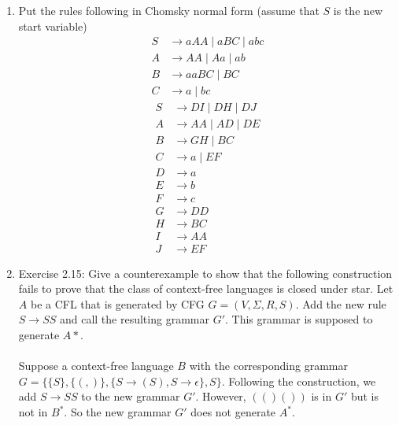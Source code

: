 \documentclass{article}
\begin{document}
\begin{enumerate}
        \item Put the rules following in Chomsky normal form (assume that $S$ is the new start variable)
            \begin{align*}
                S&\rightarrow aAA \mid aBC \mid abc\\
                A&\rightarrow AA \mid Aa \mid ab\\
                B&\rightarrow aaBC \mid BC\\
                C&\rightarrow a\mid bc
            \end{align*}
            \begin{align*}
                S&\rightarrow DI \mid DH \mid DJ\\
                A&\rightarrow AA \mid AD \mid DE\\
                B&\rightarrow GH \mid BC\\
                C&\rightarrow a \mid EF\\
                D&\rightarrow a\\
                E&\rightarrow b\\
                F&\rightarrow c\\
                G&\rightarrow DD\\
                H&\rightarrow BC\\
                I&\rightarrow AA\\
                J&\rightarrow EF
            \end{align*}
        \item Exercise 2.15: Give a counterexample to show that the following construction fails to prove that the class of context-free languages
            is closed under star. Let $A$ be a CFL that is generated by CFG $G=(V,\Sigma, R,S)$. Add the new rule $S\rightarrow SS$ and call the 
            resulting grammar $G'$. This grammar is supposed to generate $A*$.\\\\
            Suppose a context-free language $B$ with the corresponding grammar $G=\{\{S\}, \{(,)\}, \{S\rightarrow (S), S\rightarrow \epsilon\}, S\}$.
            Following the construction, we add $S\rightarrow SS$ to the new grammar $G'$. However, $(()())$ is in $G'$ but is not in $B^*$. So the new 
            grammar $G'$ does not generate $A^*$.


\end{enumerate}
\end{document}
